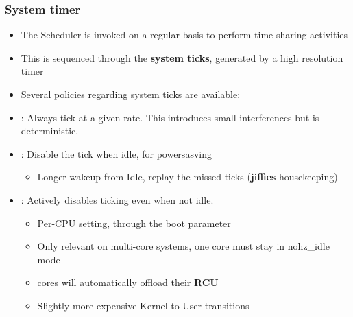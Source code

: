 \begin{frame}
	\frametitle{System timer}
	\begin{itemize}
		\item The Scheduler is invoked on a regular basis to perform time-sharing activities
		\item This is sequenced through the \textbf{system ticks}, generated by a high resolution timer
		\item Several policies regarding system ticks are available:
		\item {}: Always tick at a given rate. This introduces small interferences but is deterministic.
		\item {}: Disable the tick when idle, for powersasving
			\begin{itemize}
				\item Longer wakeup from Idle, replay the missed ticks (\textbf{jiffies} housekeeping)
			\end{itemize}
		\item {}: Actively disables ticking even when not idle.
			\begin{itemize}
				\item Per-CPU setting, through the  boot parameter
				\item Only relevant on multi-core systems, one core must stay in nohz\_idle mode
				\item {} cores will automatically offload their \textbf{RCU}
				\item Slightly more expensive Kernel to User transitions
			\end{itemize}
	\end{itemize}
\end{frame}

